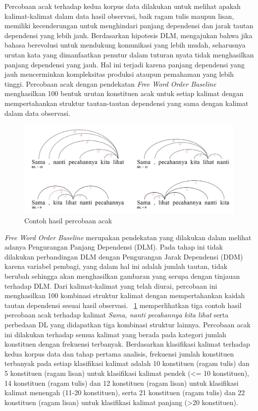 Percobaan acak terhadap kedua korpus data dilakukan untuk melihat apakah kalimat-kalimat dalam data hasil observasi, baik ragam tulis maupun lisan, memiliki kecenderungan untuk menghindari panjang dependensi dan jarak tautan dependensi yang lebih jauh. Berdasarkan hipotesis DLM, \cite{futrell2015large} mengajukan bahwa jika bahasa berevolusi untuk mendukung komunikasi yang lebih mudah, seharusnya urutan kata yang dimanfaatkan penutur dalam tuturan nyata tidak menghasilkan panjang dependensi yang jauh. Hal ini terjadi karena panjang dependensi yang jauh mencerminkan kompleksitas produksi ataupun pemahaman yang lebih tinggi. Percobaan acak dengan pendekatan \textit{Free Word Order Baseline} menghasilkan 100 bentuk urutan konstituen acak untuk setiap kalimat dengan mempertahankan struktur tautan-tautan dependensi yang sama dengan kalimat dalam data observasi. 

\begin{figure}
	\centering \includegraphics[width=0.8
	\textwidth] {pics/percobaan_acak.jpg} 
	\caption{Contoh hasil percobaan acak} 
\label{fig:percobaan_acak} 
\end{figure}

\textit{Free Word Order Baseline} merupakan pendekatan yang dilakukan \cite{futrell2015large} dalam melihat adanya Pengurangan Panjang Dependensi (DLM). Pada tahap ini tidak dilakukan perbandingan DLM dengan Pengurangan Jarak Dependensi (DDM) karena variabel pembagi, yang dalam hal ini adalah jumlah tautan, tidak berubah sehingga akan menghasilkan gambaran yang serupa dengan tinjauan terhadap DLM. Dari kalimat-kalimat yang telah diurai, percobaan ini menghasilkan 100 kombinasi struktur kalimat dengan mempertahankan kaidah tautan dependensi sesuai hasil observasi. \pic~\ref{fig:percobaan_acak} memperlihatkan tiga contoh hasil percobaan acak terhadap kalimat \textit{Sama, nanti pecahannya kita lihat} serta perbedaan DL yang didapatkan tiga kombinasi struktur lainnya. Percobaan acak ini dilakukan terhadap semua kalimat yang berada pada kategori jumlah konstituen dengan frekuensi terbanyak. Berdasarkan klasifikasi kalimat terhadap kedua korpus data dan tahap pertama analisis, frekuensi jumlah konstituen terbanyak pada setiap klasifikasi kalimat adalah 10 konstituen (ragam tulis) dan 5 konstituen (ragam lisan) untuk klasifikasi kalimat pendek (\textless= 10 konstituen), 14 konstituen (ragam tulis) dan 12 konstituen (ragam lisan) untuk klasifikasi kalimat menengah (11-20 konstituen), serta 21 konstituen (ragam tulis) dan 22 konstituen (ragam lisan) untuk klasifikasi kalimat panjang (\textgreater 20 konstituen). 

